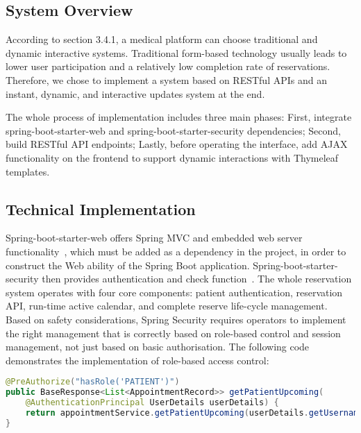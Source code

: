 \subsection{System Overview}
\label{subsec:reservation-overview}

According to section 3.4.1, a medical platform can choose traditional and dynamic interactive systems. Traditional form-based technology usually leads to lower user participation and a relatively low completion rate of reservations. Therefore, we chose to implement a system based on RESTful APIs and an instant, dynamic, and interactive updates system at the end.

The whole process of implementation includes three main phases: First, integrate spring-boot-starter-web and spring-boot-starter-security dependencies; Second, build RESTful API endpoints; Lastly, before operating the interface, add AJAX functionality on the frontend to support dynamic interactions with Thymeleaf templates.

\subsection{Technical Implementation}
\label{subsec:reservation-technical}

Spring-boot-starter-web offers Spring MVC and embedded web server functionality~\cite{spring-mvc}, which must be added as a dependency in the project, in order to construct the Web ability of the Spring Boot application. Spring-boot-starter-security then provides authentication and check function~\cite{spring-security}. The whole reservation system operates with four core components: patient authentication, reservation API, run-time active calendar, and complete reserve life-cycle management. Based on safety considerations, Spring Security requires operators to implement the right management that is correctly based on role-based control and session management, not just based on basic authorisation. The following code demonstrates the implementation of role-based access control:

\begin{lstlisting}[language=Java, caption=Role-based Access Control Implementation]
@PreAuthorize("hasRole('PATIENT')")
public BaseResponse<List<AppointmentRecord>> getPatientUpcoming(
    @AuthenticationPrincipal UserDetails userDetails) {
    return appointmentService.getPatientUpcoming(userDetails.getUsername());
}
\end{lstlisting}

